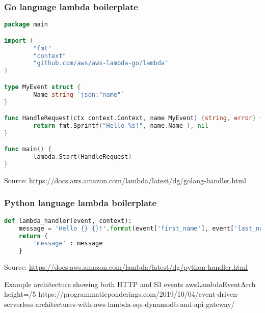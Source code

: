 \documentclass[11pt,aspectratio=169]{beamer}
\begin{document}
\begin{nrcanFrame}[fragile=singleslide]
    \frametitle{Go language lambda boilerplate}
  \centering
{\scriptsize
  \begin{lstlisting}[language=go]
package main

import (
        "fmt"
        "context"
        "github.com/aws/aws-lambda-go/lambda"
)

type MyEvent struct {
        Name string `json:"name"`
}

func HandleRequest(ctx context.Context, name MyEvent) (string, error) {
        return fmt.Sprintf("Hello %s!", name.Name ), nil
}

func main() {
        lambda.Start(HandleRequest)
}
  \end{lstlisting}
}
  {\tiny Source: \url{https://docs.aws.amazon.com/lambda/latest/dg/golang-handler.html}}
\end{nrcanFrame}





  \begin{nrcanFrame}[fragile=singleslide]
    \frametitle{Python language lambda boilerplate}
               {\footnotesize
                 \begin{lstlisting}[language=python]
def lambda_handler(event, context):
    message = 'Hello {} {}!'.format(event['first_name'], event['last_name'])  
    return { 
        'message' : message
    }
                 \end{lstlisting}
                 
                 \vspace{3cm}
                        {\tiny Source: \url{https://docs.aws.amazon.com/lambda/latest/dg/python-handler.html}}}
  \end{nrcanFrame}


\nrcanGraphicFrame
  {Example architecture showing both HTTP and S3 events}
  {awsLambdaEventArch}
  {height=/5}
  {https://programmaticponderings.com/2019/10/04/event-driven-serverless-architectures-with-aws-lambda-sqs-dynamodb-and-api-gateway/}
\end{document}

